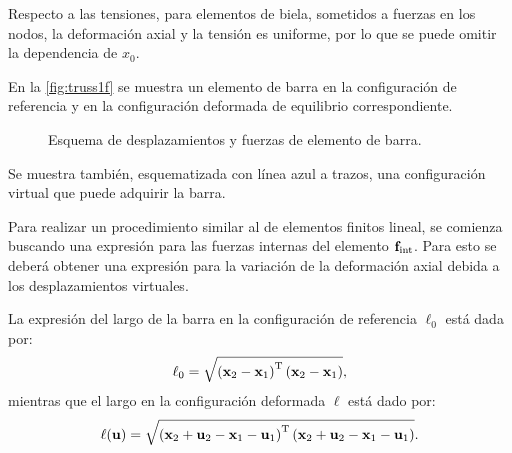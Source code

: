 Respecto a las tensiones, para elementos de biela, sometidos a fuerzas en los nodos, la deformación axial y la tensión es uniforme, por lo que se puede omitir la dependencia de $x_0$.

En la \autoref{fig:truss1f} se muestra un elemento de barra en la configuración de referencia y en la configuración deformada de equilibrio correspondiente. %
%
\begin{figure}[htb]
	\centering
	\def\svgwidth{0.7\textwidth}
    
	\caption{Esquema de desplazamientos y fuerzas de elemento de barra.}
	\label{fig:truss1f}
\end{figure}
%
Se muestra también, esquematizada con línea azul a trazos, una configuración virtual que puede adquirir la barra.


Para realizar un procedimiento similar al de elementos finitos lineal, se comienza buscando una expresión para las fuerzas internas del elemento ${\bf f}_{\text{int}}$. %
%
Para esto se deberá obtener una expresión para la variación de la deformación axial debida a los desplazamientos virtuales. %


La expresión del largo de la barra en la configuración de referencia $\ell_0$ está dada por:
%
\begin{equation}
\ell_0 = \sqrt{ \left( {\bf x}_2 - {\bf x}_1\right)^{\text{T}} \left( {\bf x}_2 - {\bf x}_1\right)},
\end{equation}
%
mientras que el largo en la configuración deformada $\ell$ está dado por:
%
\begin{equation}
\ell ({\bf u})
= \sqrt{
	\left( {\bf x}_2+{\bf u}_2 - {\bf x}_1 -{\bf u}_1 \right)^{\text{T}}
	\left( {\bf x}_2+{\bf u}_2 - {\bf x}_1 -{\bf u}_1 \right)
}.
\end{equation}
%



